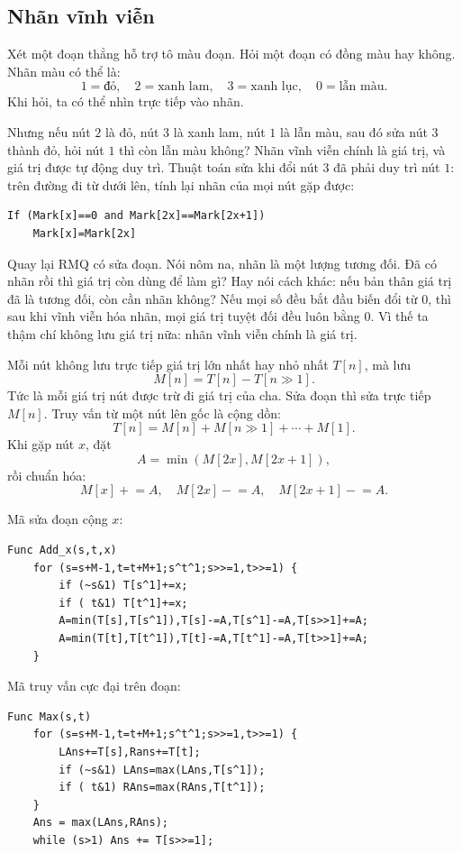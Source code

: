\documentclass[11pt]{article}
\begin{document}
\subsection{Nhãn vĩnh viễn}

Xét một đoạn thẳng hỗ trợ tô màu đoạn.  Hỏi một đoạn có đồng màu hay không.
Nhãn màu có thể là:
\[
  1=\text{đỏ},\quad 2=\text{xanh lam},\quad
  3=\text{xanh lục},\quad 0=\text{lẫn màu}.
\]
Khi hỏi, ta có thể nhìn trực tiếp vào nhãn.

Nhưng nếu nút $2$ là đỏ, nút $3$ là xanh lam, nút $1$ là lẫn màu, sau đó sửa
nút $3$ thành đỏ, hỏi nút $1$ thì còn lẫn màu không?  Nhãn vĩnh viễn chính là
giá trị, và giá trị được tự động duy trì.  Thuật toán sửa khi đổi nút $3$ đã
phải duy trì nút $1$: trên đường đi từ dưới lên, tính lại nhãn của mọi nút gặp
được:
\begin{verbatim}
If (Mark[x]==0 and Mark[2x]==Mark[2x+1])
    Mark[x]=Mark[2x]
\end{verbatim}

Quay lại RMQ có sửa đoạn.  Nói nôm na, nhãn là một lượng tương đối.  Đã có
nhãn rồi thì giá trị còn dùng để làm gì?  Hay nói cách khác: nếu bản thân giá
trị đã là tương đối, còn cần nhãn không?  Nếu mọi số đều bắt đầu biến đổi từ
$0$, thì sau khi vĩnh viễn hóa nhãn, mọi giá trị tuyệt đối đều luôn bằng $0$.
Vì thế ta thậm chí không lưu giá trị nữa: nhãn vĩnh viễn chính là giá trị.

Mỗi nút không lưu trực tiếp giá trị lớn nhất hay nhỏ nhất $T[n]$, mà lưu
\[
  M[n]=T[n]-T[n\gg 1].
\]
Tức là mỗi giá trị nút được trừ đi giá trị của cha.  Sửa đoạn thì sửa trực
tiếp $M[n]$.  Truy vấn từ một nút lên gốc là cộng dồn:
\[
  T[n]=M[n]+M[n\gg 1]+\cdots+M[1].
\]
Khi gặp nút $x$, đặt
\[
  A=\min(M[2x],M[2x+1]),
\]
rồi chuẩn hóa:
\[
  M[x]\mathrel{+}=A,\quad
  M[2x]\mathrel{-}=A,\quad
  M[2x+1]\mathrel{-}=A.
\]

Mã sửa đoạn cộng $x$:
\begin{verbatim}
Func Add_x(s,t,x)
    for (s=s+M-1,t=t+M+1;s^t^1;s>>=1,t>>=1) {
        if (~s&1) T[s^1]+=x;
        if ( t&1) T[t^1]+=x;
        A=min(T[s],T[s^1]),T[s]-=A,T[s^1]-=A,T[s>>1]+=A;
        A=min(T[t],T[t^1]),T[t]-=A,T[t^1]-=A,T[t>>1]+=A;
    }
\end{verbatim}

Mã truy vấn cực đại trên đoạn:
\begin{verbatim}
Func Max(s,t)
    for (s=s+M-1,t=t+M+1;s^t^1;s>>=1,t>>=1) {
        LAns+=T[s],Rans+=T[t];
        if (~s&1) LAns=max(LAns,T[s^1]);
        if ( t&1) RAns=max(RAns,T[t^1]);
    }
    Ans = max(LAns,RAns);
    while (s>1) Ans += T[s>>=1];
\end{verbatim}
\end{document}
